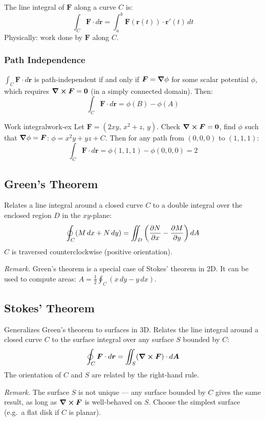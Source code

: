 \documentclass[11pt, letterpaper]{article}
\theoremstyle{plain}
\newenvironment{remark}{\smallskip\noindent\textit{Remark.}}{\smallskip}
\newcommand{\vv}[1]{\bm{#1}}
\begin{document}
The line integral of $\vv{F}$ along a curve $C$ is:
\[
    \int_C \vv{F}\cdot d\vv{r} = \int_a^b \vv{F}(\vv{r}(t))\cdot\vv{r}'(t)\,dt
\]
Physically: work done by $\vv{F}$ along $C$.

\subsubsection*{Path Independence}
$\int_C \vv{F}\cdot d\vv{r}$ is path-independent if and only if
$\vv{F} = \grad\phi$ for some scalar potential $\phi$, which requires
$\curl\vv{F} = \vv{0}$ (in a simply connected domain). Then:
\[
    \int_C \vv{F}\cdot d\vv{r} = \phi(B) - \phi(A)
\]

\begin{example}{Work integral}{work-ex}
    Let $\vv{F} = (2xy,\, x^2 + z,\, y)$. Check $\curl\vv{F} = \vv{0}$,
    find $\phi$ such that $\grad\phi = \vv{F}$:
    $\phi = x^2y + yz + C$. Then for any path from $(0,0,0)$ to $(1,1,1)$:
    \[
        \int_C \vv{F}\cdot d\vv{r} = \phi(1,1,1) - \phi(0,0,0) = 2
    \]
\end{example}


\subsection{Green's Theorem}

Relates a line integral around a closed curve $C$ to a double integral
over the enclosed region $D$ in the $xy$-plane:
\[
    \oint_C (M\,dx + N\,dy) = \iint_D \left(\pdv{N}{x} - \pdv{M}{y}\right)dA
\]
$C$ is traversed counterclockwise (positive orientation).

\begin{remark}
    Green's theorem is a special case of Stokes' theorem in 2D.
    It can be used to compute areas:
    $A = \frac{1}{2}\oint_C (x\,dy - y\,dx)$.
\end{remark}


\subsection{Stokes' Theorem}

Generalizes Green's theorem to surfaces in 3D. Relates the line integral
around a closed curve $C$ to the surface integral over any surface $S$
bounded by $C$:
\[
    \oint_C \vv{F}\cdot d\vv{r} = \iint_S (\curl\vv{F})\cdot d\vv{A}
\]
The orientation of $C$ and $S$ are related by the right-hand rule.

\begin{remark}
    The surface $S$ is not unique — any surface bounded by $C$ gives the
    same result, as long as $\curl\vv{F}$ is well-behaved on $S$.
    Choose the simplest surface (e.g.\ a flat disk if $C$ is planar).
\end{remark}
\end{document}
